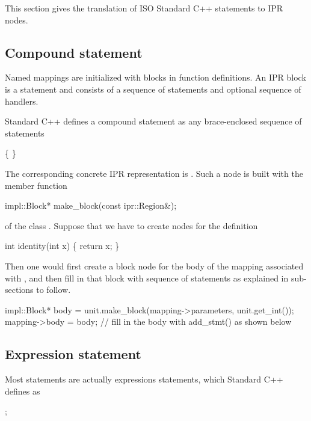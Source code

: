 \documentclass[a4paper,12pt]{article}
\begin{document}
This section gives the translation of ISO Standard C++ statements to IPR
nodes. 

\subsection{Compound statement}
\label{sec:stmt.compound}

Named mappings are initialized with blocks in function definitions.
An IPR block is a statement and consists of a sequence of statements and
optional sequence of handlers.

Standard C++ defines a compound statement as any brace-enclosed sequence of
statements
\begin{Grammar}
     \{  \}

       
\end{Grammar}

The corresponding concrete IPR representation is .
Such a node is built with the member function
\begin{Program}
  impl::Block* make_block(const ipr::Region&);
\end{Program}
of the class .  Suppose that we have to create nodes for
the definition
\begin{Program}
  int identity(int x) \{ return x; \}
\end{Program}
Then one would first create a block node for the body of the mapping
associated with , and then fill in that block with sequence of
statements as explained in sub-sections to follow.
\begin{Program}
impl::Block* body = unit.make_block(mapping->parameters, unit.get_int());
mapping->body = body;
// fill in the body with add_stmt() as shown below
\end{Program}


\subsection{Expression statement}
\label{sec:stmt.expr}
Most statements are actually expressions statements, which Standard C++ 
defines as
\begin{Grammar}
       ;
\end{Grammar}
\end{document}

